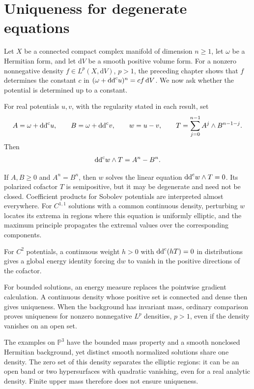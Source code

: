 \chapter{Uniqueness for degenerate equations}
\label{chap:degenerate-uniqueness}

Let $X$ be a connected compact complex manifold of dimension $n\geq1$, let $\omega$ be a Hermitian form, and let $\mathrm dV$ be a smooth positive volume form. For a nonzero nonnegative density $f\in L^p(X,\mathrm dV)$, $p>1$, the preceding chapter shows that $f$ determines the constant $c$ in $(\omega+\mathrm{dd}^{\mathrm{c}} u)^n=cf\,\mathrm dV$. We now ask whether the potential is determined up to a constant.

For real potentials $u,v$, with the regularity stated in each result, set
\[
 A=\omega+\mathrm{dd}^{\mathrm{c}} u,\qquad B=\omega+\mathrm{dd}^{\mathrm{c}} v,\qquad w=u-v,
 \qquad T=\sum_{j=0}^{n-1}A^j\wedge B^{n-1-j}.
\]
Then
\begin{equation}\label{uni-eq:linearization}
 \mathrm{dd}^{\mathrm{c}} w\wedge T=A^n-B^n.
\end{equation}

If $A,B\geq0$ and $A^n=B^n$, then $w$ solves the linear equation $\mathrm{dd}^{\mathrm{c}} w\wedge T=0$. Its polarized cofactor $T$ is semipositive, but it may be degenerate and need not be closed. Coefficient products for Sobolev potentials are interpreted almost everywhere. For $C^{1,1}$ solutions with a common continuous density, perturbing $w$ locates its extrema in regions where this equation is uniformly elliptic, and the maximum principle propagates the extremal values over the corresponding components.

For $C^2$ potentials, a continuous weight $h>0$ with $\mathrm{dd}^{\mathrm{c}}(hT)=0$ in distributions gives a global energy identity forcing $\mathrm dw$ to vanish in the positive directions of the cofactor.

For bounded solutions, an energy measure replaces the pointwise gradient calculation. A continuous density whose positive set is connected and dense then gives uniqueness. When the background has invariant mass, ordinary comparison proves uniqueness for nonzero nonnegative $L^p$ densities, $p>1$, even if the density vanishes on an open set.

The examples on $\mathbb P^3$ have the bounded mass property and a smooth nonclosed Hermitian background, yet distinct smooth normalized solutions share one density. The zero set of this density separates the elliptic regions: it can be an open band or two hypersurfaces with quadratic vanishing, even for a real analytic density. Finite upper mass therefore does not ensure uniqueness.













